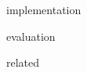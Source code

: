 \documentclass[12pt,a4paper,oneside]{article}
\begin{document}
\singlespacing

\onehalfspacing

\tableofcontents
\newpage









 {implementation}

 {evaluation}

 {related}



\end{document}
